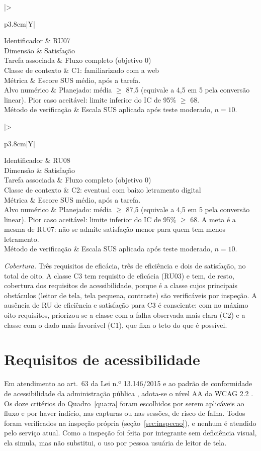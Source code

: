 \documentclass[
  12pt,
  oneside,
  a4paper,
  chapter=TITLE,
  section=TITLE,
  english,
  brazilian
]{abntex2}
\renewcommand{\fonte}[1]{\par\vspace{3pt}{\footnotesize\raggedright\noindent Fonte: #1\par}\vspace{4pt}}%
\newcommand{\requisito}[7]{%
  \begin{quadro}[!htb]
    \caption{Requisito #1}\label{qua:#1}
    \centering\small
    \begin{tabularx}{\textwidth}{|>{\raggedright\arraybackslash}p{3.8cm}|Y|}\hline
      Identificador          & #1 \\\hline
      Dimensão               & #2 \\\hline
      Tarefa associada       & #3 \\\hline
      Classe de contexto     & #4 \\\hline
      Métrica                & #5 \\\hline
      Alvo numérico          & #6 \\\hline
      Método de verificação  & #7 \\\hline
    \end{tabularx}
    \fonte{Elaborado pelos autores (\the\year).}
  \end{quadro}\FloatBarrier}
\begin{document}
\requisito{RU07}{Satisfação}{Fluxo completo (objetivo 0)}{C1: familiarizado com a web}%
  {Escore SUS médio, após a tarefa.}%
  {Planejado: média $\geq$ 87,5 (equivale a 4,5 em 5 pela conversão linear). Pior caso aceitável: limite inferior do IC de 95\% $\geq$ 68.}%
  {Escala SUS aplicada após teste moderado, $n=10$.}

\requisito{RU08}{Satisfação}{Fluxo completo (objetivo 0)}{C2: eventual com baixo letramento digital}%
  {Escore SUS médio, após a tarefa.}%
  {Planejado: média $\geq$ 87,5 (equivale a 4,5 em 5 pela conversão linear). Pior caso aceitável: limite inferior do IC de 95\% $\geq$ 68. A meta é a mesma de RU07: não se admite satisfação menor para quem tem menos letramento.}%
  {Escala SUS aplicada após teste moderado, $n=10$.}

\textit{Cobertura.} Três requisitos de eficácia, três de eficiência e dois de
satisfação, no total de oito. A classe C3 tem requisito de eficácia (RU03) e
tem, de resto, cobertura dos requisitos de acessibilidade, porque é a classe
cujos principais obstáculos (leitor de tela, tela pequena, contraste) são
verificáveis por inspeção. A ausência de RU de eficiência e satisfação para C3 é
consciente: com no máximo oito requisitos, priorizou-se a classe com a falha
observada mais clara (C2) e a classe com o dado mais favorável (C1), que fixa o
teto do que é possível.

\chapter{Requisitos de acessibilidade}\label{cap:acessibilidade}

Em atendimento ao art.~63 da Lei n.º 13.146/2015 \cite{lbi2015} e ao padrão de conformidade de acessibilidade da administração pública \cite{emag}, adota-se o nível AA da WCAG 2.2 \cite{wcag22}. Os doze critérios do Quadro~\ref{qua:ra} foram escolhidos por serem aplicáveis ao fluxo e por haver indício, nas capturas ou nas sessões, de risco de falha. Todos foram verificados na inspeção própria (seção~\ref{sec:inspecao}), e nenhum é atendido pelo serviço atual. Como a inspeção foi feita por integrante sem deficiência visual, ela simula, mas não substitui, o uso por pessoa usuária de leitor de tela.
\end{document}

